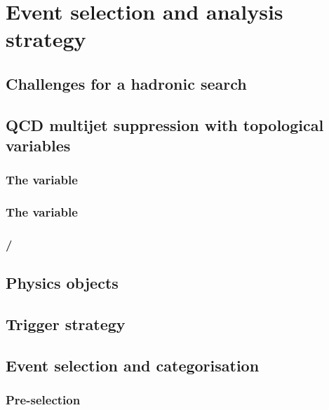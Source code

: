 \chapter{Event selection and analysis strategy}
\label{chap:selection}

\section{Challenges for a hadronic \BSM search}
\label{sec:challenge}



\section{QCD multijet suppression with topological variables}
\label{sec:challenge}

\subsection{The \alphaT variable}

\subsection{The \bDPhi variable}

\subsection{\MHT/\MET}

\section{Physics objects}

\section{Trigger strategy}

\section{Event selection and categorisation}

\subsection{Pre-selection}

